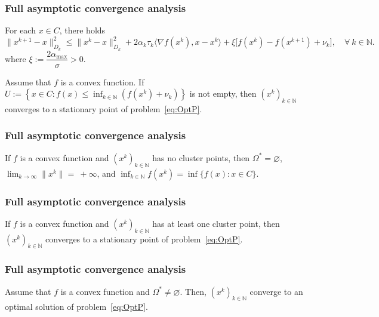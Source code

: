 \documentclass[xcolor=dvipsnames,aspectratio=169,13pt]{beamer} %
\begin{document}
\begin{frame}[c]\frametitle{Full asymptotic convergence analysis}
 \begin{lemma}
  For each  $x\in C$, there holds
  \begin{equation*}
    \|x^{k+1}-x\|_{D_k}^2 \leq \|x^k-x\|_{D_k}^2 + 2\alpha_k\tau_k \Big\langle \nabla f(x^k), x-x^k\Big\rangle + \xi \Big[f(x^k) - f(x^{k+1})+ \nu_k \Big], \quad \forall ~k \in \mathbb{N}.
  \end{equation*}
  where $\xi := \dfrac{2 \alpha_{\max}}{\sigma} > 0.$
\end{lemma}
\begin{corollary}
  Assume that $f$ is a convex function. If $U := \left\{x \in C: f(x) \leq \inf_{k\in {\mathbb N}}\left(f(x^{k})+\nu_k\right) \right\}$ is not empty, then $(x^k)_{k\in\mathbb{N}}$ converges to a stationary point of problem~\eqref{eq:OptP}.
\end{corollary}
\end{frame}


\begin{frame}[t]\frametitle{Full asymptotic convergence analysis}


\begin{theorem}
  If $f$ is a convex function and $(x^k)_{k\in\mathbb{N}}$ has no cluster points,  then $\Omega^* = \varnothing$, $\lim_{k \to \infty} \|x^k\|=~+\infty$, and $\inf_{k\in {\mathbb N}} f(x^k) = \inf \{f(x) : x \in C\}$.
\end{theorem}
\end{frame}


\begin{frame}[t]\frametitle{Full asymptotic convergence analysis}
\begin{corollary}
  If $f$ is a convex function and $(x^k)_{k\in\mathbb{N}}$ has at least one cluster point, then    $(x^k)_{k\in\mathbb{N}}$ converges to a stationary point of problem~\eqref{eq:OptP}.
\end{corollary}

\end{frame}


\begin{frame}[t]\frametitle{Full asymptotic convergence analysis}
\begin{theorem}
  Assume that $f$ is a convex function and  $\Omega^* \neq \varnothing$. Then,   $(x^k)_{k\in\mathbb{N}}$ converge to an optimal solution of problem~\eqref{eq:OptP}.
\end{theorem}
\end{frame}
\end{document}
